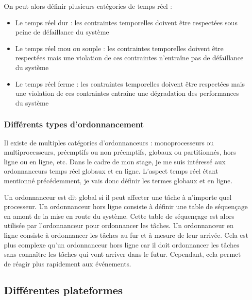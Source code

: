 On peut alors définir plusieurs catégories de temps réel :
\begin{itemize}
    \item Le temps réel dur : les contraintes temporelles doivent être respectées sous peine de défaillance du système
    \item Le temps réel mou ou souple : les contraintes temporelles doivent être respectées mais une violation de ces contraintes n'entraîne pas de défaillance du système
    \item Le temps réel ferme : les contraintes temporelles doivent être respectées mais une violation de ces contraintes entraîne une dégradation des performances du système
\end{itemize}

\subsubsection{Différents types d'ordonnancement}

Il existe de multiples catégories d'ordonnanceurs : monoprocesseurs ou multiprocesseurs, préemptifs ou non préemptifs, globaux ou partitionnés, hors ligne ou en ligne, etc. Dans le cadre de mon stage, je me suis intéressé aux ordonnanceurs temps réel globaux et en ligne. L'aspect temps réel étant mentionné précédemment, je vais donc définir les termes globaux et en ligne. 

Un ordonnanceur est dit global si il peut affecter une tâche à n'importe quel processeur. Un ordonnanceur hors ligne consiste à définir une table de séquençage en amont de la mise en route du système. Cette table de séquençage est alors utilisée par l'ordonnanceur pour ordonnancer les tâches. Un ordonnanceur en ligne consiste à ordonnancer les tâches au fur et à mesure de leur arrivée. Cela est plus complexe qu'un ordonnanceur hors ligne car il doit ordonnancer les tâches sans connaître les tâches qui vont arriver dans le futur. Cependant, cela permet de réagir plus rapidement aux événements.


\subsection{Différentes plateformes}

